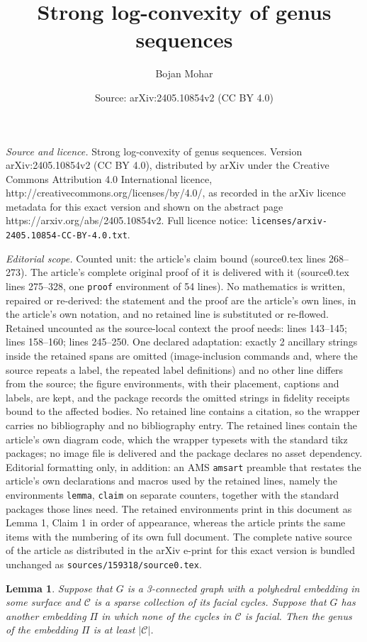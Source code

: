 \documentclass[10pt,a4paper]{amsart}
\title{Strong log-convexity of genus sequences}
\author{Bojan Mohar}
\date{Source: arXiv:2405.10854v2 (CC BY 4.0)}
\newtheorem{lemma}{Lemma}
\newcommand\C{\mathcal C}
\begin{document}
\maketitle

\noindent\emph{Source and licence.} Strong log-convexity of genus sequences. Version arXiv:2405.10854v2 (CC BY 4.0), distributed by arXiv under the Creative Commons Attribution 4.0 International licence, http://creativecommons.org/licenses/by/4.0/, as recorded in the arXiv licence metadata for this exact version and shown on the abstract page https://arxiv.org/abs/2405.10854v2. Full licence notice: \texttt{licenses/arxiv-2405.10854-CC-BY-4.0.txt}.\par\smallskip

\noindent\textit{Editorial scope.} Counted unit: the article's claim bound (source0.tex lines 268--273). The article's complete original proof of it is delivered with it (source0.tex lines 275--328, one \texttt{proof} environment of 54 lines). No mathematics is written, repaired or re-derived: the statement and the proof are the article's own lines, in the article's own notation, and no retained line is substituted or re-flowed.  Retained uncounted as the source-local context the proof needs: lines 143--145; lines 158--160; lines 245--250.  One declared adaptation: exactly 2 ancillary strings inside the retained spans are omitted (image-inclusion commands and, where the source repeats a label, the repeated label definitions) and no other line differs from the source; the figure environments, with their placement, captions and labels, are kept, and the package records the omitted strings in fidelity receipts bound to the affected bodies.  No retained line contains a citation, so the wrapper carries no bibliography and no bibliography entry.  The retained lines contain the article's own diagram code, which the wrapper typesets with the standard tikz packages; no image file is delivered and the package declares no asset dependency.  Editorial formatting only, in addition: an AMS \texttt{amsart} preamble that restates the article's own declarations and macros used by the retained lines, namely the environments \texttt{lemma}, \texttt{claim} on separate counters, together with the standard packages those lines need.  The retained environments print in this document as Lemma 1, Claim 1 in order of appearance, whereas the article prints the same items with the numbering of its own full document.  The complete native source of the article as distributed in the arXiv e-print for this exact version is bundled unchanged as \texttt{sources/159318/source0.tex}.
\begin{lemma}\label{lem:non cofacial faces}
   Suppose that $G$ is a 3-connected graph with a polyhedral embedding in some surface and $\C$ is a sparse collection of its facial cycles. Suppose that $G$ has another embedding $\Pi$ in which none of the cycles in $\C$ is facial. Then the genus of the embedding $\Pi$ is at least $|\C|$.
\end{lemma}
\end{document}

